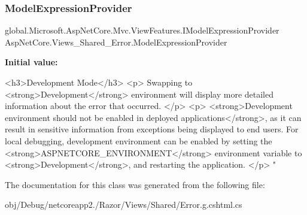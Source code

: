 \subsubsection{\texorpdfstring{Model\+Expression\+Provider}{ModelExpressionProvider}}
{\footnotesize\ttfamily global.\+Microsoft.\+Asp\+Net\+Core.\+Mvc.\+View\+Features.\+I\+Model\+Expression\+Provider Asp\+Net\+Core.\+Views\+\_\+\+Shared\+\_\+\+Error.\+Model\+Expression\+Provider\hspace{0.3cm}{\ttfamily [get]}}

{\bfseries Initial value\+:}
\begin{DoxyCode}

<h3>Development Mode</h3>
<p>
    Swapping to <strong>Development</strong> environment will display more detailed information about the 
      error that occurred.
</p>
<p>
    <strong>Development environment should not be enabled in deployed applications</strong>, as it can 
      result in sensitive information from exceptions being displayed to end users. For local debugging, development 
      environment can be enabled by setting the <strong>ASPNETCORE\_ENVIRONMENT</strong> environment variable to
       <strong>Development</strong>, and restarting the application.
</p>
\textcolor{stringliteral}{"}
\end{DoxyCode}


The documentation for this class was generated from the following file\+:\begin{DoxyCompactItemize}
\item 
obj/\+Debug/netcoreapp2./\+Razor/\+Views/\+Shared/Error.\+g.\+cshtml.\+cs\end{DoxyCompactItemize}
